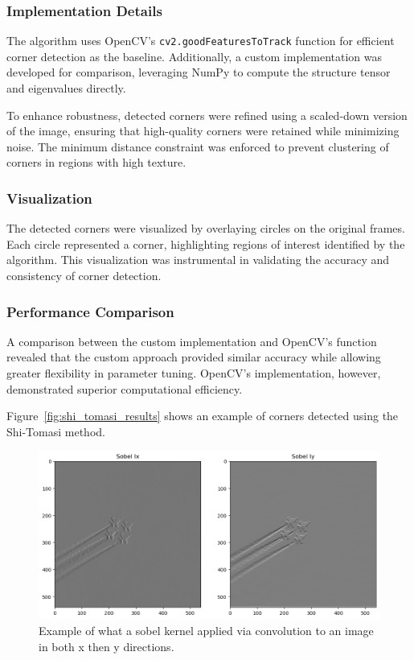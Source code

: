 \documentclass[11pt, conference, letterpaper]{IEEEtran}
\begin{document}
\subsubsection{Implementation Details}
The algorithm uses OpenCV's \texttt{cv2.goodFeaturesToTrack} function for efficient corner detection as the baseline. Additionally, a custom implementation was developed for comparison, leveraging NumPy to compute the structure tensor and eigenvalues directly.

To enhance robustness, detected corners were refined using a scaled-down version of the image, ensuring that high-quality corners were retained while minimizing noise. The minimum distance constraint was enforced to prevent clustering of corners in regions with high texture.

\subsubsection{Visualization}
The detected corners were visualized by overlaying circles on the original frames. Each circle represented a corner, highlighting regions of interest identified by the algorithm. This visualization was instrumental in validating the accuracy and consistency of corner detection.

\subsubsection{Performance Comparison}
A comparison between the custom implementation and OpenCV's function revealed that the custom approach provided similar accuracy while allowing greater flexibility in parameter tuning. OpenCV's implementation, however, demonstrated superior computational efficiency.

Figure~\ref{fig:shi_tomasi_results} shows an example of corners detected using the Shi-Tomasi method. 

\begin{figure}[h]
    \centering
    \includegraphics[width=\linewidth]{images/gradients_sample.png}
    \caption{Example of what a sobel kernel applied via convolution to an image in both x then y directions.}
    \label{fig:sobel_gradient}
\end{figure}
\end{document}
